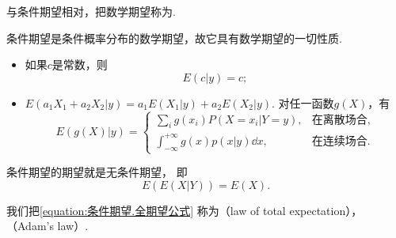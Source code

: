 与条件期望相对，把数学期望称为.

条件期望是条件概率分布的数学期望，故它具有数学期望的一切性质.
\begin{itemize}
	\item 如果\(c\)是常数，则\begin{equation*}
		E(c \vert y) = c;
	\end{equation*}

	\item \(E(a_1 X_1 + a_2 X_2 \vert y)
	= a_1 E(X_1 \vert y) + a_2 E(X_2 \vert y)\).
	对任一函数\(g(X)\)，有\begin{equation*}
		E(g(X) \vert y)
		= \left\{ \begin{array}{cl}
			\sum_i g(x_i) P(X=x_i \vert Y = y),
			& \text{在离散场合}, \\
			\int_{-\infty}^{+\infty} g(x) p(x \vert y) \dd{x},
			& \text{在连续场合}.
		\end{array} \right.
	\end{equation*}
\end{itemize}

\begin{theorem}
条件期望的期望就是无条件期望，
即\begin{equation}\label{equation:条件期望.全期望公式}
	E(E(X \vert Y)) = E(X).
\end{equation}
\end{theorem}

我们把\cref{equation:条件期望.全期望公式}
称为（law of total expectation），
（Adam's law）.


